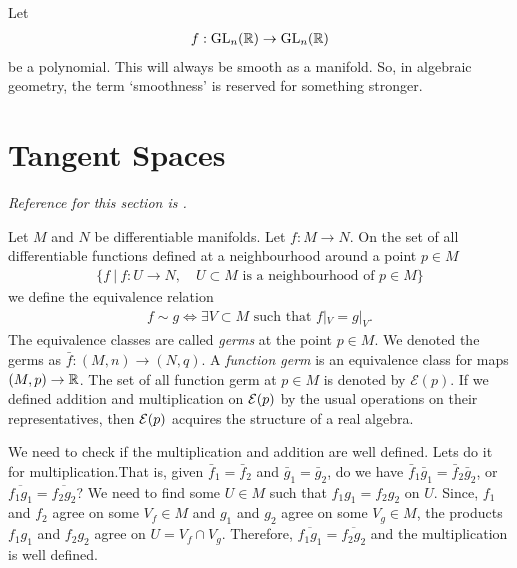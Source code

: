 \begin{insight} %
    Let 
    \begin{align}
        f: \operatorname{GL}_n(\mathbb{R}) \to \operatorname{GL}_n(\mathbb{R})
    \end{align}
    be a polynomial. This will always be smooth as a manifold. So, in algebraic geometry, the term `smoothness' is reserved for something stronger.
\end{insight}

\section{Tangent Spaces}
\label{sec:tangent_spaces}

\emph{Reference for this section is \cite{brocker1982introduction}.}

Let $M$ and $N$ be differentiable manifolds. Let $f: M\to N$. On the set of all differentiable functions defined at a neighbourhood around a point $p\in M$
\begin{align}
    \{f\ |\ f: U\to N, \quad U\subset M \text{ is a neighbourhood of $p\in M$}\}
\end{align}
we define the equivalence relation
\begin{align}
    f \sim g \iff \exists V\subset M \text{ such that } f|_V = g|_V.
\end{align}
The equivalence classes are called \emph{germs} at the point $p\in M$. We denoted the germs as $\bar f: (M,n)\to (N,q)$. A \emph{function germ} is an equivalence class for maps $(M,p)\to \mathbb{R}$. The set of all function germ at $p\in M$ is denoted by $\mathcal E(p)$. If we defined addition and multiplication on $\mathcal E(p)$ by the usual operations on their representatives, then $\mathcal E (p)$ acquires the structure of a real algebra.
\begin{insight}
    We need to check if the multiplication and addition are well defined. Lets do it for multiplication.That is, given $\bar f_1 = \bar f_2$ and $\bar g_1 = \bar g_2$, do we have $\bar f_1 \bar g_1 = \bar f_2 \bar g_2$, or $\overline{f_1 g_1}=\overline{f_2 g_2}$? We need to find some $U\in M$ such that $f_1g_1=f_2g_2$ on $U$. Since, $f_1$ and $f_2$ agree on some $V_f\in M$ and $g_1$ and $g_2$ agree on some $V_g\in M$, the products $f_1 g_1$ and $f_2 g_2$ agree on $U=V_f\cap V_g$. Therefore, $\overline{f_1 g_1} = \overline{f_2 g_2}$ and the multiplication is well defined. 
\end{insight}

